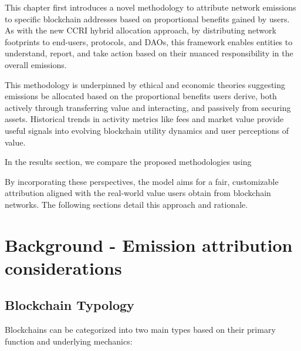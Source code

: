 \documentclass[11pt]{report}
\begin{document}
This chapter first introduces a novel methodology to attribute network emissions to specific blockchain addresses based on proportional benefits gained by users. As with the new \ac{CCRI} hybrid allocation approach, by distributing network footprints to end-users, protocols, and DAOs, this framework enables entities to understand, report, and take action based on their nuanced responsibility in the overall emissions.

This methodology is underpinned by ethical and economic theories suggesting emissions be allocated based on the proportional benefits users derive, both actively through transferring value and interacting, and passively from securing assets. Historical trends in activity metrics like fees and market value provide useful signals into evolving blockchain utility dynamics and user perceptions of value.

In the results section, we compare the proposed methodologies using

By incorporating these perspectives, the model aims for a fair, customizable attribution aligned with the real-world value users obtain from blockchain networks. The following sections detail this approach and rationale.

\section{Background - Emission attribution considerations}

\subsection{Blockchain Typology}
Blockchains can be categorized into two main types based on their primary function and underlying mechanics:
\end{document}
